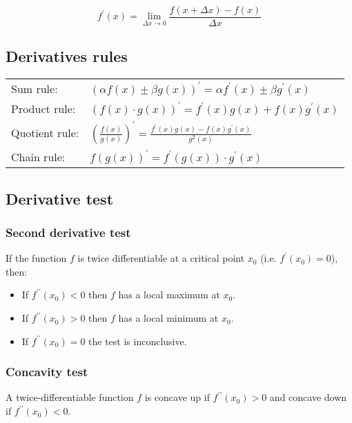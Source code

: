 \[
f^\prime(x) = \lim_{\Delta x \rightarrow 0} \frac{ f( x + \Delta x ) - f(x) }{\Delta x}
\]

\subsection{Derivatives rules}
\begin{tabular}{ l l }
Sum rule:      & $ \displaystyle (\alpha f(x) \pm \beta g(x) )^\prime = \alpha f^\prime(x) \pm \beta g^\prime(x) $  \\
Product rule:  & $ \displaystyle (f(x) \cdot g(x) )^\prime = f^\prime(x) g(x) + f(x) g^\prime(x) $ \\
Quotient rule: & $ \displaystyle \left( \frac{f(x)}{g(x)} \right)^\prime = \frac{ f^\prime(x) g(x) - f(x) g^\prime(x) }{ g^2(x) } $ \\
Chain rule:    & $ \displaystyle f\left( g(x) \right) ^\prime = f^\prime\left( g(x) \right) \cdot g^\prime(x) $
\end{tabular}

\subsection{Derivative test}

\subsubsection{Second derivative test}
If the function $f$ is twice differentiable at a critical point $x_0$ (i.e. $f^\prime(x_0) = 0$), then:
\begin{itemize}
\item If $ f^{\prime \prime }(x_0)<0 $ then $f$  has a local maximum at $x_0$.
\item If $ f^{\prime \prime }(x_0)>0 $ then $f$  has a local minimum at $x_0$.
\item If $ f^{\prime \prime }(x_0)=0 $ the test is inconclusive.
\end{itemize}

\subsubsection{Concavity test}
A twice-differentiable function $f$ is concave up if $ f^{\prime \prime }(x_0)>0 $ and concave down if $ f^{\prime \prime }(x_0)<0 $.

